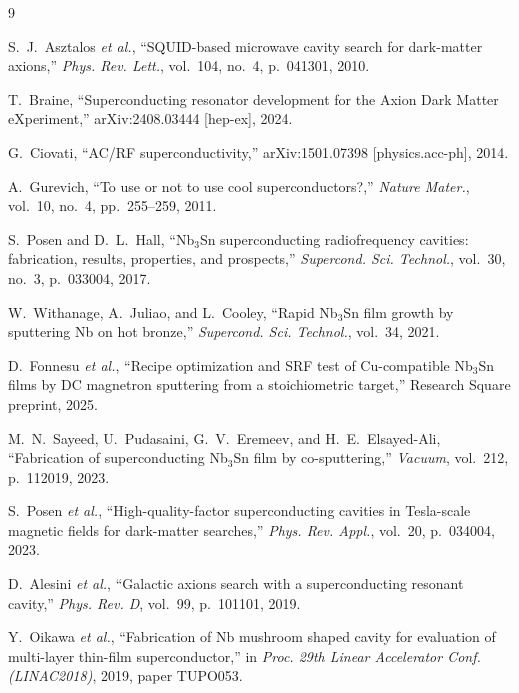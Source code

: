 \documentclass[10pt,journal]{IEEEtran}
\begin{document}
\begin{thebibliography}{9}

S.~J.~Asztalos \emph{et al.}, ``SQUID-based microwave cavity search for dark-matter axions,'' \emph{Phys. Rev. Lett.}, vol.~104, no.~4, p.~041301, 2010.

T.~Braine, ``Superconducting resonator development for the Axion Dark Matter eXperiment,'' arXiv:2408.03444 [hep-ex], 2024.

G.~Ciovati, ``AC/RF superconductivity,'' arXiv:1501.07398 [physics.acc-ph], 2014.

A.~Gurevich, ``To use or not to use cool superconductors?,'' \emph{Nature Mater.}, vol.~10, no.~4, pp.~255--259, 2011.

S.~Posen and D.~L.~Hall, ``Nb$_3$Sn superconducting radiofrequency cavities: fabrication, results, properties, and prospects,'' \emph{Supercond. Sci. Technol.}, vol.~30, no.~3, p.~033004, 2017.

W.~Withanage, A.~Juliao, and L.~Cooley, ``Rapid Nb$_3$Sn film growth by sputtering Nb on hot bronze,'' \emph{Supercond. Sci. Technol.}, vol.~34, 2021.

D.~Fonnesu \emph{et al.}, ``Recipe optimization and SRF test of Cu-compatible Nb$_3$Sn films by DC magnetron sputtering from a stoichiometric target,'' Research Square preprint, 2025.

M.~N.~Sayeed, U.~Pudasaini, G.~V.~Eremeev, and H.~E.~Elsayed-Ali, ``Fabrication of superconducting Nb$_3$Sn film by co-sputtering,'' \emph{Vacuum}, vol.~212, p.~112019, 2023.

S.~Posen \emph{et al.}, ``High-quality-factor superconducting cavities in Tesla-scale magnetic fields for dark-matter searches,'' \emph{Phys. Rev. Appl.}, vol.~20, p.~034004, 2023.

D.~Alesini \emph{et al.}, ``Galactic axions search with a superconducting resonant cavity,'' \emph{Phys. Rev. D}, vol.~99, p.~101101, 2019.

Y.~Oikawa \emph{et al.}, ``Fabrication of Nb mushroom shaped cavity for evaluation of multi-layer thin-film superconductor,'' in \emph{Proc. 29th Linear Accelerator Conf. (LINAC2018)}, 2019, paper TUPO053.


\end{thebibliography}
\end{document}
